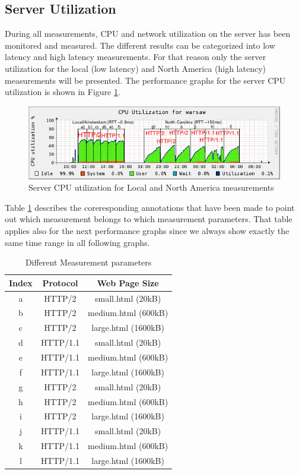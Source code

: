 \subsection{Server Utilization}
\label{subsec:server_util}

During all measurements, CPU and network utilization on the server has been monitored and measured. The different results can be categorized into low latency and high latency measurements. For that reason only the server utilization for the local (low latency) and North America (high latency) measurements will be presented. The performance graphs for the server CPU utilization is shown in Figure \ref{fig:cpu}.  

\begin{figure}[H]
\centering
\includegraphics[scale=0.6,trim=0.0cm .0cm .0cm .0cm,clip]{images/cpu3.png}
\caption{Server CPU utilization for Local and North America measurements}
\label{fig:cpu}
\end{figure}

Table \ref{table:cpu} describes the coreresponding annotations that have been made to point out which measurement belongs to which measurement parameters. That table applies also for the next performance graphs since we always show exactly the same time range in all following graphs.

\begin{table}[h]
	\centering
\begin{tabular}{ | c | c | c | }

\hline
\textbf{Index} &\textbf{Protocol} &\textbf{Web Page Size}\\ \hline \hline
a & HTTP/2 & small.html (20kB)\\ \hline
b & HTTP/2 & medium.html (600kB)\\ \hline
c & HTTP/2 & large.html (1600kB)\\ \hline
d & HTTP/1.1 & small.html (20kB) \\ \hline
e & HTTP/1.1 & medium.html (600kB) \\ \hline
f & HTTP/1.1 & large.html (1600kB)\\ \hline 
g & HTTP/2 & small.html (20kB)\\ \hline
h & HTTP/2 & medium.html (600kB)\\ \hline
i & HTTP/2 & large.html (1600kB)\\ \hline
j & HTTP/1.1 & small.html (20kB) \\ \hline
k & HTTP/1.1 & medium.html (600kB) \\ \hline
l & HTTP/1.1 & large.html (1600kB)\\  
\hline
\end{tabular}
\caption{Different Measurement parameters}
\label{table:cpu}
\end{table} 
 
